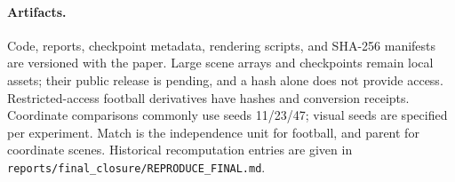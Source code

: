 \paragraph{Artifacts.} Code, reports, checkpoint metadata, rendering
scripts, and SHA-256 manifests are versioned with the paper. Large scene
arrays and checkpoints remain local assets; their public release is
pending, and a hash alone does not provide access. Restricted-access
football derivatives have hashes and conversion receipts. Coordinate
comparisons commonly use seeds 11/23/47; visual seeds are specified per
experiment. Match is the independence unit for football, and parent for
coordinate scenes. Historical recomputation entries are given in
\texttt{reports/final\_closure/REPRODUCE\_FINAL.md}.
